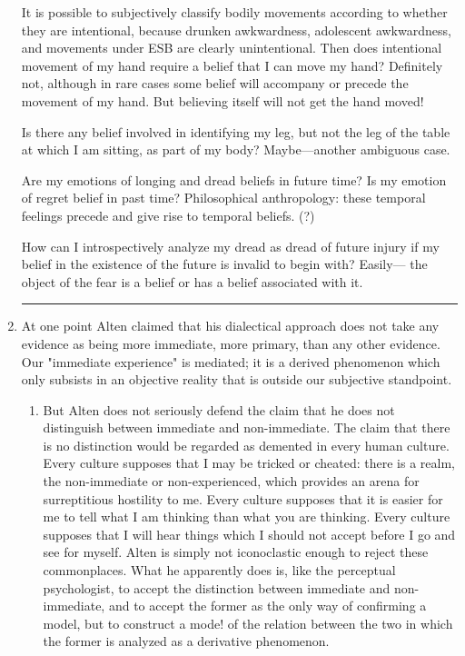 \documentclass[10pt,twoside]{memoir}
\begin{document}
\begin{enumerate}
It is possible to subjectively classify bodily movements according to 
whether they are intentional, because drunken awkwardness, adolescent 
awkwardness, and movements under ESB are clearly unintentional. Then 
does intentional movement of my hand require a belief that I can move my 
hand? Definitely not, although in rare cases some belief will accompany or 
precede the movement of my hand. But believing itself will not get the hand 
moved! 

Is there any belief involved in identifying my leg, but not the leg of the 
table at which I am sitting, as part of my body? Maybe---another ambiguous 
case.

Are my emotions of longing and dread beliefs in future time? Is my 
emotion of regret belief in past time? Philosophical anthropology: these 
temporal feelings precede and give rise to temporal beliefs. (?) 

How can I introspectively analyze my dread as dread of future injury if 
my belief in the existence of the future is invalid to begin with? Easily--- the 
object of the fear is a belief or has a belief associated with it. 

\plainbreak{2}

\item At one point Alten claimed that his dialectical approach does not 
take any evidence as being more immediate, more primary, than any other 
evidence. Our "immediate experience" is mediated; it is a derived 
phenomenon which only subsists in an objective reality that is outside our 
subjective standpoint. 

\begin{enumerate}

\item But Alten does not seriously defend the claim that he does not 
distinguish between immediate and non-immediate. The claim that there is 
no distinction would be regarded as demented in every human culture. Every 
culture supposes that I may be tricked or cheated: there is a realm, the 
non-immediate or non-experienced, which provides an arena for surreptitious 
hostility to me. Every culture supposes that it is easier for me to tell what I 
am thinking than what you are thinking. Every culture supposes that I will 
hear things which I should not accept before I go and see for myself. Alten is 
simply not iconoclastic enough to reject these commonplaces. What he 
apparently does is, like the perceptual psychologist, to accept the distinction 
between immediate and non-immediate, and to accept the former as the only 
way of confirming a model, but to construct a mode! of the relation between 
the two in which the former is analyzed as a derivative phenomenon. 


\end{enumerate}
\end{enumerate}
\end{document}
